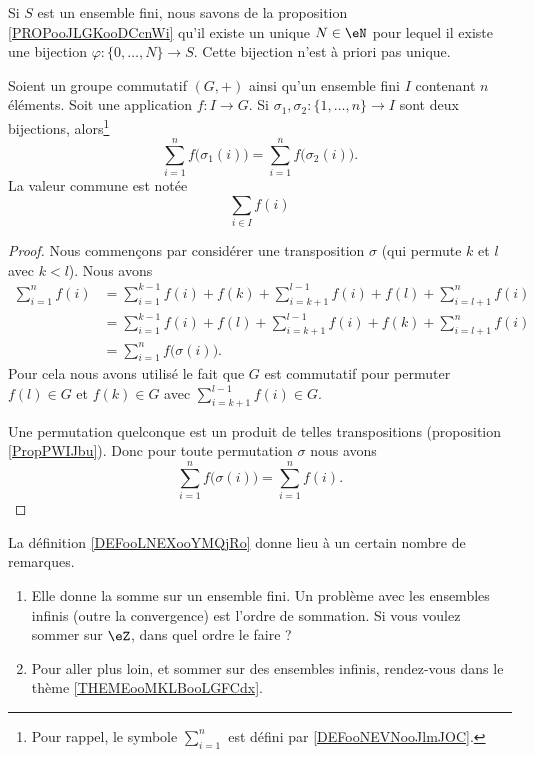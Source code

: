 Si \( S\) est un ensemble fini, nous savons de la proposition \ref{PROPooJLGKooDCcnWi} qu'il existe un unique \( N\in \eN\) pour lequel il existe une bijection \( \varphi\colon \{ 0,\ldots, N \}\to S\). Cette bijection n'est à priori pas unique.

\begin{lemmaDef}       \label{DEFooLNEXooYMQjRo}
	Soient un groupe commutatif \( (G,+)\) ainsi qu'un ensemble fini \( I\) contenant \( n\) éléments. Soit une application \( f\colon I\to G \). Si \( \sigma_1,\sigma_2\colon \{1,\ldots, n \}\to I\) sont deux bijections, alors\footnote{Pour rappel, le symbole \( \sum_{i=1}^n\) est défini par \ref{DEFooNEVNooJlmJOC}.}
	\begin{equation}
		\sum_{i=1}^nf\big( \sigma_1(i) \big)=\sum_{i=1}^nf\big( \sigma_2(i) \big).
	\end{equation}
	La valeur commune est notée
	\begin{equation}
		\sum_{i\in I}f(i)
	\end{equation}
\end{lemmaDef}

\begin{proof}
	Nous commençons par considérer une transposition \( \sigma\) (qui permute \( k\) et \( l\) avec \( k<l\)). Nous avons
	\begin{subequations}
		\begin{align}
			\sum_{i=1}^nf(i) & =\sum_{i=1}^{k-1}f(i)+f(k)+\sum_{i=k+1}^{l-1}f(i)+f(l)+\sum_{i=l+1}^nf(i) \\
			                 & =\sum_{i=1}^{k-1}f(i)+f(l)+\sum_{i=k+1}^{l-1}f(i)+f(k)+\sum_{i=l+1}^nf(i) \\
			                 & =\sum_{i=1}^nf\big( \sigma(i) \big).
		\end{align}
	\end{subequations}
	Pour cela nous avons utilisé le fait que \( G\) est commutatif pour permuter \( f(l)\in G\) et \( f(k)\in G\) avec \( \sum_{i=k+1}^{l-1}f(i)\in G\).

	Une permutation quelconque est un produit de telles transpositions (proposition \ref{PropPWIJbu}). Donc pour toute permutation \( \sigma\) nous avons
	\begin{equation}
		\sum_{i=1}^nf\big( \sigma(i) \big)=\sum_{i=1}^nf(i).
	\end{equation}
\end{proof}

La définition \ref{DEFooLNEXooYMQjRo} donne lieu à un certain nombre de remarques.
\begin{enumerate}
	\item
	      Elle donne la somme sur un ensemble fini. Un problème avec les ensembles infinis (outre la convergence) est l'ordre de sommation. Si vous voulez sommer sur \( \eZ\), dans quel ordre le faire ?
	\item
	      Pour aller plus loin, et sommer sur des ensembles infinis, rendez-vous dans le thème \ref{THEMEooMKLBooLGFCdx}.
\end{enumerate}

